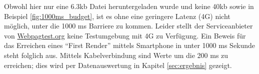 	  Obwohl hier nur eine 6.3kb Datei heruntergeladen wurde und keine 40kb sowie in Beispiel \ref{fig:1000ms_budget}, ist es ohne eine geringere Latenz (4G) nicht möglich, unter die 1000 ms Barriere zu kommen. Leider stellt der Serviceanbieter von \url{Webpagtest.org} keine Testumgebung mit 4G zu Verfügung. Ein Beweis für das Erreichen eines "`First Render"' mittels Smartphone in unter 1000 ms Sekunde steht folglich aus. Mittels Kabelverbindung sind Werte um die 200 ms zu erreichen; dies wird per Datenauswertung in Kapitel \ref{sec:ergebnis} gezeigt.



\pagebreak
